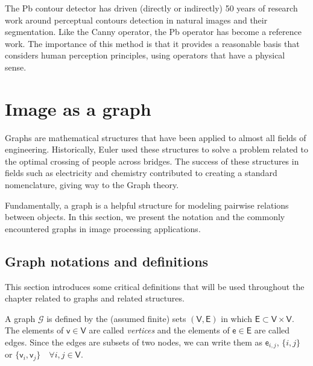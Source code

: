 The Pb contour detector has driven (directly or indirectly) 50 years of research work around perceptual contours detection in natural images and their segmentation. Like the Canny operator, the Pb operator has become a reference work. The importance of this method is that it provides a reasonable basis that considers human perception principles, using operators that have a physical sense. 


\section{Image as a graph}

Graphs are mathematical structures that have been applied to almost all fields of engineering. Historically, Euler used these structures to solve a problem related to the optimal crossing of people across bridges. The success of these structures in fields such as electricity and chemistry contributed to creating a standard nomenclature, giving way to the Graph theory. 

Fundamentally, a graph is a helpful structure for modeling pairwise relations between objects. In this section, we present the notation and the commonly encountered graphs in image processing applications. 





\subsection{Graph notations and definitions}

This section introduces some critical definitions that will be used throughout the chapter related to graphs and related structures. 

\theoremstyle{definition}
\begin{definition}[Graph]
	A graph $\mathcal{G}$ is defined by the (assumed finite) sets $(\mathsf{V}, \mathsf{E})$ in which $\mathsf{E} \subset \mathsf{V} \times \mathsf{V}$. The elements of $\mathsf{v} \in \mathsf{V}$ are called \textit{vertices} and the elements of $\mathsf{e} \in \mathsf{E}$ are called edges. Since the edges are subsets of two nodes, we can write them as $\mathsf{e}_{i,j}$, $\{i, j\}$ or $\{\mathsf{v}_{i}, \mathsf{v}_{j}\} \quad \forall i, j \in \mathsf{V}$.
\end{definition}

